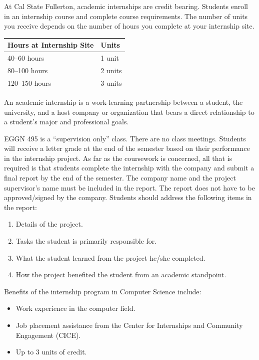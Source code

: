 \documentclass{book}
\begin{document}
At Cal State Fullerton, academic internships are credit bearing. Students enroll in an internship course and complete course requirements. The number of units you receive depends on the number of hours you complete at your internship site.

\begin{center}
\begin{tabular}{|l|l|} \hline
  \textbf{Hours at Internship Site} & \textbf{Units} \\ \hline
  40--60 hours & 1 unit \\ \hline
  80--100 hours & 2 units \\ \hline
  120--150 hours & 3 units \\ \hline
\end{tabular}
\end{center}

An academic internship is a work-learning partnership between a student, the university, and a host company or organization that bears a direct relationship to a student’s major and professional goals.

EGGN 495 is a ``supervision only'' class. There are no class meetings. Students will receive a letter grade at the end of the semester based on their performance in the internship project. As far as the coursework is concerned, all that is required is that students complete the internship with the company and submit a final report by the end of the semester. The company name and the project supervisor’s name must be included in the report. The report does not have to be approved/signed by the company. Students should address the following items in the report:
\begin{enumerate}
\item Details of the project.
\item Tasks the student is primarily responsible for.
\item What the student learned from the project he/she completed.
\item How the project benefited the student from an academic standpoint.
\end{enumerate}

Benefits of the internship program in Computer Science include:
\begin{itemize}
\item Work experience in the computer field.
\item Job placement assistance from the Center for Internships and Community Engagement (CICE).
\item Up to 3 units of credit.
\end{itemize}
\end{document}
